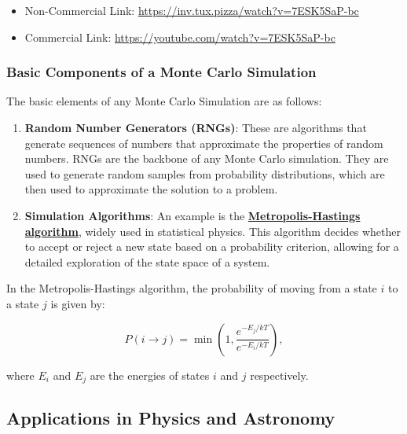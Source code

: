 \href{https://inv.tux.pizza/watch?v=7ESK5SaP-bc}{\pandocbounded{\texttt{[image: https://markdown-videos-api.jorgenkh.no/youtube/7ESK5SaP-bc?width=720\&height=405]}}}

\begin{itemize}
\tightlist
\item
  Non-Commercial Link: \url{https://inv.tux.pizza/watch?v=7ESK5SaP-bc}
\item
  Commercial Link: \url{https://youtube.com/watch?v=7ESK5SaP-bc}
\end{itemize}

\subsubsection{Basic Components of a Monte Carlo
Simulation}\label{basic-components-of-a-monte-carlo-simulation}

The basic elements of any Monte Carlo Simulation are as follows:

\begin{enumerate}
\def\labelenumi{\arabic{enumi}.}
\tightlist
\item
  \textbf{Random Number Generators (RNGs)}: These are algorithms that
  generate sequences of numbers that approximate the properties of
  random numbers. RNGs are the backbone of any Monte Carlo simulation.
  They are used to generate random samples from probability
  distributions, which are then used to approximate the solution to a
  problem.
\item
  \textbf{Simulation Algorithms}: An example is the
  \href{https://en.wikipedia.org/wiki/Metropolis-Hastings_algorithm}{\textbf{Metropolis-Hastings
  algorithm}}, widely used in statistical physics. This algorithm
  decides whether to accept or reject a new state based on a probability
  criterion, allowing for a detailed exploration of the state space of a
  system.
\end{enumerate}

In the Metropolis-Hastings algorithm, the probability of moving from a
state \(i\) to a state \(j\) is given by:

\[P(i \rightarrow j) = \min\left(1, \frac{e^{-E_j/kT}}{e^{-E_i/kT}}\right),\]

where \(E_i\) and \(E_j\) are the energies of states \(i\) and \(j\)
respectively.

\subsection{Applications in Physics and
Astronomy}\label{applications-in-physics-and-astronomy}

